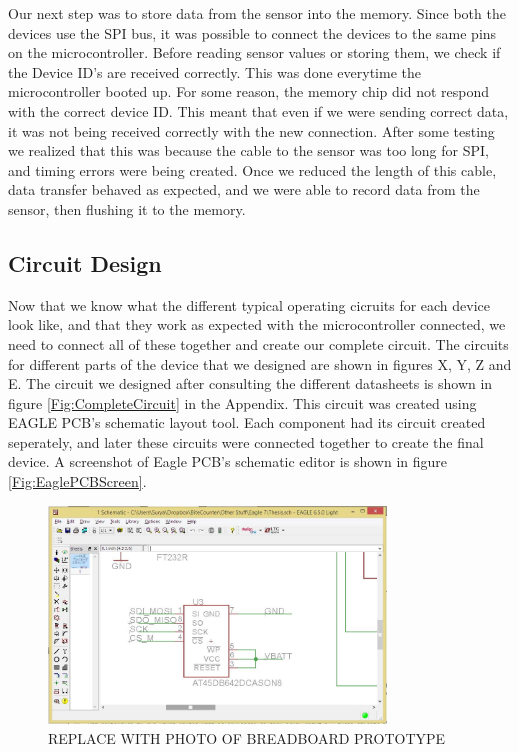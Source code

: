 Our next step was to store data from the sensor into the memory.
Since both the devices use the SPI bus,
it was possible to connect the devices to the same pins on the microcontroller.
Before reading sensor values or storing them,
we check if the Device ID's are received correctly.
This was done everytime the microcontroller booted up.
For some reason, the memory chip did not respond with the correct device ID.
This meant that even if we were sending correct data,
it was not being received correctly with the new connection.
After some testing we realized that this was because the cable to the sensor was too long for SPI,
and timing errors were being created.
Once we reduced the length of this cable,
data transfer behaved as expected,
and we were able to record data from the sensor,
then flushing it to the memory.

\subsection{Circuit Design}
\label{Sec:CircuitDesign}
Now that we know what the different typical operating cicruits for each device look like,
and that they work as expected with the microcontroller connected,
we need to connect all of these together and create our complete circuit.
The circuits for different parts of the device that we designed are shown in figures X, Y, Z and E.
The circuit we designed after consulting the different datasheets is shown in figure \ref{Fig:CompleteCircuit} in the Appendix.
This circuit was created using EAGLE PCB's schematic layout tool.
Each component had its circuit created seperately,
and later these circuits were connected together to create the final device.
A screenshot of Eagle PCB's schematic editor is shown in figure \ref{Fig:EaglePCBScreen}.
\begin{figure}
\begin{center}
\includegraphics[width=0.8\textwidth]{images/EagleScreen.jpg}
\caption{REPLACE WITH PHOTO OF BREADBOARD PROTOTYPE}
\label{Fig:BreadBoardProto}
\end{center}
\end{figure}

